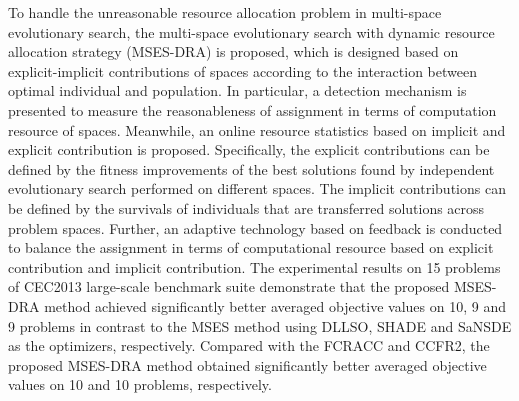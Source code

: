 \begin{eabstract}
 To handle the unreasonable resource allocation problem in multi-space evolutionary search, the multi-space evolutionary search with dynamic resource allocation strategy (MSES-DRA) is proposed, which is designed based on explicit-implicit contributions of spaces according to the interaction between optimal individual and population. In particular, a detection mechanism is presented to measure the reasonableness of assignment in terms of computation resource of spaces. Meanwhile, an online resource statistics based on implicit and explicit contribution is proposed. Specifically, the explicit contributions can be defined by the fitness improvements of the best solutions found by independent evolutionary search performed on different spaces. The implicit contributions can be defined by the survivals of individuals that are transferred solutions across problem spaces. Further, an adaptive technology based on feedback is conducted to balance the assignment in terms of computational resource based on explicit contribution and implicit contribution. The experimental results on 15 problems of CEC2013 large-scale benchmark suite demonstrate that the proposed MSES-DRA method achieved significantly better averaged objective values on 10, 9 and 9 problems in contrast to the MSES method using DLLSO, SHADE and SaNSDE as the optimizers, respectively. Compared with the FCRACC and CCFR2, the proposed MSES-DRA method obtained significantly better averaged objective values on 10 and 10 problems, respectively.  
\end{eabstract}

